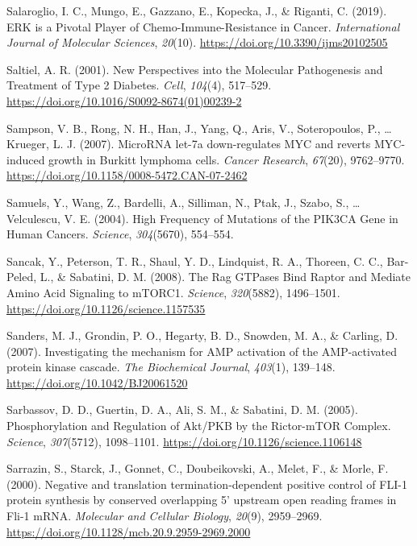 \documentclass[12pt,openany]{book}
\begin{document}
\hypertarget{ref-Salaroglio2019}{}
Salaroglio, I. C., Mungo, E., Gazzano, E., Kopecka, J., \& Riganti, C.
(2019). ERK is a Pivotal Player of Chemo-Immune-Resistance in Cancer.
\emph{International Journal of Molecular Sciences}, \emph{20}(10).
\url{https://doi.org/10.3390/ijms20102505}

\hypertarget{ref-Saltiel2001}{}
Saltiel, A. R. (2001). New Perspectives into the Molecular Pathogenesis
and Treatment of Type 2 Diabetes. \emph{Cell}, \emph{104}(4), 517--529.
\url{https://doi.org/10.1016/S0092-8674(01)00239-2}

\hypertarget{ref-Sampson2007}{}
Sampson, V. B., Rong, N. H., Han, J., Yang, Q., Aris, V., Soteropoulos,
P., \ldots{} Krueger, L. J. (2007). MicroRNA let-7a down-regulates MYC
and reverts MYC-induced growth in Burkitt lymphoma cells. \emph{Cancer
Research}, \emph{67}(20), 9762--9770.
\url{https://doi.org/10.1158/0008-5472.CAN-07-2462}

\hypertarget{ref-Samuels2004}{}
Samuels, Y., Wang, Z., Bardelli, A., Silliman, N., Ptak, J., Szabo, S.,
\ldots{} Velculescu, V. E. (2004). High Frequency of Mutations of the
PIK3CA Gene in Human Cancers. \emph{Science}, \emph{304}(5670),
554--554.

\hypertarget{ref-Sancak2008}{}
Sancak, Y., Peterson, T. R., Shaul, Y. D., Lindquist, R. A., Thoreen, C.
C., Bar-Peled, L., \& Sabatini, D. M. (2008). The Rag GTPases Bind
Raptor and Mediate Amino Acid Signaling to mTORC1. \emph{Science},
\emph{320}(5882), 1496--1501.
\url{https://doi.org/10.1126/science.1157535}

\hypertarget{ref-Sanders2007}{}
Sanders, M. J., Grondin, P. O., Hegarty, B. D., Snowden, M. A., \&
Carling, D. (2007). Investigating the mechanism for AMP activation of
the AMP-activated protein kinase cascade. \emph{The Biochemical
Journal}, \emph{403}(1), 139--148.
\url{https://doi.org/10.1042/BJ20061520}

\hypertarget{ref-Sarbassov2005}{}
Sarbassov, D. D., Guertin, D. A., Ali, S. M., \& Sabatini, D. M. (2005).
Phosphorylation and Regulation of Akt/PKB by the Rictor-mTOR Complex.
\emph{Science}, \emph{307}(5712), 1098--1101.
\url{https://doi.org/10.1126/science.1106148}

\hypertarget{ref-Sarrazin2000}{}
Sarrazin, S., Starck, J., Gonnet, C., Doubeikovski, A., Melet, F., \&
Morle, F. (2000). Negative and translation termination-dependent
positive control of FLI-1 protein synthesis by conserved overlapping 5'
upstream open reading frames in Fli-1 mRNA. \emph{Molecular and Cellular
Biology}, \emph{20}(9), 2959--2969.
\url{https://doi.org/10.1128/mcb.20.9.2959-2969.2000}
\end{document}
